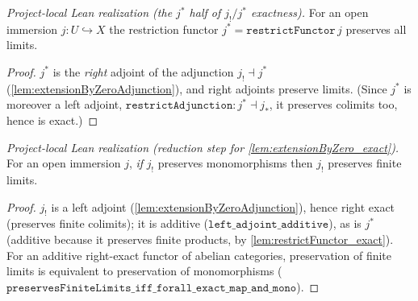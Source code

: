 \begin{lemma}

  \label{lem:restrictFunctor_exact}
  \textit{Project-local Lean realization (the $j^{*}$ half of $j_!/j^{*}$ exactness).}
  For an open immersion $j : U \hookrightarrow X$ the restriction functor
  $j^{*} = \mathtt{restrictFunctor}\,j$ preserves all limits.
  \begin{proof}
    $j^{*}$ is the \emph{right} adjoint of the adjunction $j_! \dashv j^{*}$
    (\cref{lem:extensionByZeroAdjunction}), and right adjoints preserve limits.
    (Since $j^{*}$ is moreover a left adjoint, $\mathtt{restrictAdjunction} :
    j^{*} \dashv j_{*}$, it preserves colimits too, hence is exact.)
  \end{proof}
\end{lemma}

\begin{lemma}

  \label{lem:extensionByZero_exact_of_mono}
  \textit{Project-local Lean realization (reduction step for \cref{lem:extensionByZero_exact}).}
  For an open immersion $j$, \emph{if} $j_!$ preserves monomorphisms then $j_!$
  preserves finite limits.
  \begin{proof}
    $j_!$ is a left adjoint (\cref{lem:extensionByZeroAdjunction}), hence
    right exact (preserves finite colimits); it is additive ($\mathtt{left\_adjoint\_additive}$),
    as is $j^{*}$ (additive because it preserves finite products, by
    \cref{lem:restrictFunctor_exact}). For an additive right-exact functor of
    abelian categories, preservation of finite limits is equivalent to
    preservation of monomorphisms
    ($\mathtt{preservesFiniteLimits\_iff\_forall\_exact\_map\_and\_mono}$).
  \end{proof}
\end{lemma}

